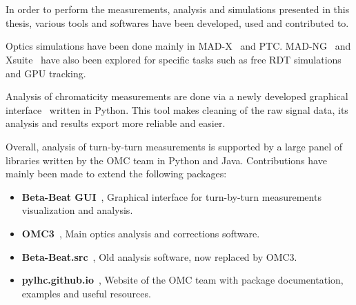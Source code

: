 \section{}


\subsection{}

In order to perform the measurements, analysis and simulations presented in this thesis, various
tools and softwares have been developed, used and contributed to.

Optics simulations have been done mainly in MAD-X~\cite{deniau_mad-x_nodate} and PTC.
MAD-NG~\cite{deniau_mad-ng_2020} and
Xsuite~\cite{g_iadarola_xsuite_nodate} have also been explored for specific tasks such as free RDT
simulations and GPU tracking.

Analysis of chromaticity measurements are done via a newly developed graphical
interface~\cite{m_le_garrec_non-linear_2022} written in Python. This tool makes cleaning of the raw
signal data, its analysis and results export more reliable and easier.

Overall, analysis of turn-by-turn measurements is supported by a large panel of libraries written by
the OMC team in Python and Java. Contributions have mainly been made to extend the following
packages:


\begin{itemize}
    \item \textbf{Beta-Beat GUI}~\cite{omc-team_beta-beat_2008}, Graphical interface for
    turn-by-turn measurements visualization and analysis.
    \item \textbf{OMC3}~\cite{omc-team_omc3_2021}, Main optics analysis and corrections software.
    \item \textbf{Beta-Beat.src}~\cite{omc-team_beta-beatsrc_2018}, Old analysis software, now
    replaced by OMC3.
    \item \textbf{pylhc.github.io}~\cite{omc-team_omc_2020}, Website of the OMC team with package
    documentation, examples and useful resources.
\end{itemize}



\subsection{}

